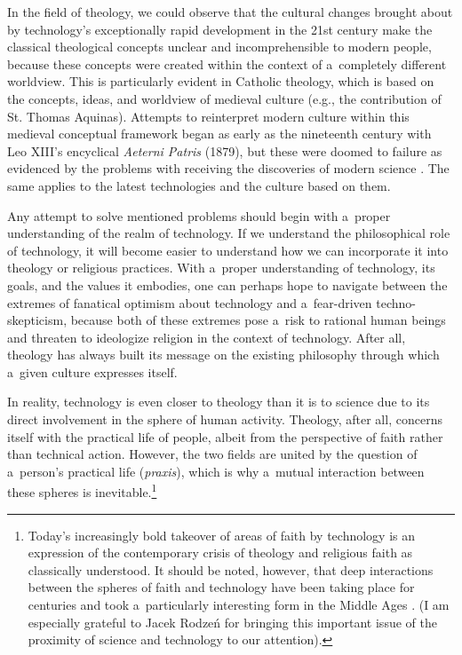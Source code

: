 In the field of theology, we could observe that the cultural changes brought about by technology's exceptionally rapid development in the 21st century make the classical theological concepts unclear and incomprehensible to modern people, because these concepts were created within the context of a~completely different worldview. This is particularly evident in Catholic theology, which is based on the concepts, ideas, and worldview of medieval culture (e.g., the contribution of St. Thomas Aquinas). Attempts to reinterpret modern culture within this medieval conceptual framework began as early as the nineteenth century with Leo XIII's encyclical \textit{Aeterni Patris} (1879), but these were doomed to failure as evidenced by the problems with receiving the discoveries of modern science 
\parencite[][]{polak_theory_2023}. %
 The same applies to the latest technologies and the culture based on them.



Any attempt to solve mentioned problems should begin with a~proper understanding of the realm of technology. If we understand the philosophical role of technology, it will become easier to understand how we can incorporate it into theology or religious practices. With a~proper understanding of technology, its goals, and the values it embodies, one can perhaps hope to navigate between the extremes of fanatical optimism about technology and a~fear-driven techno-skepticism, because both of these extremes pose a~risk to rational human beings and threaten to ideologize religion in the context of technology. After all, theology has always built its message on the existing philosophy through which a~given culture expresses itself.



In reality, technology is even closer to theology than it is to science due to its direct involvement in the sphere of human activity. Theology, after all, concerns itself with the practical life of people, albeit from the perspective of faith rather than technical action. However, the two fields are united by the question of a~person's practical life (\textit{praxis}), which is why a~mutual interaction between these spheres is inevitable.\footnote{Today's increasingly bold takeover of areas of faith by technology 
\parencite[see.g.][]{wildman_spirit_2021} %
 is an expression of the contemporary crisis of theology and religious faith as classically understood. It should be noted, however, that deep interactions between the spheres of faith and technology have been taking place for centuries and took a~particularly interesting form in the Middle Ages 
\parencite[][]{ovitt_restoration_1987}. %
 (I am especially grateful to Jacek Rodzeń for bringing this important issue of the proximity of science and technology to our attention).}



